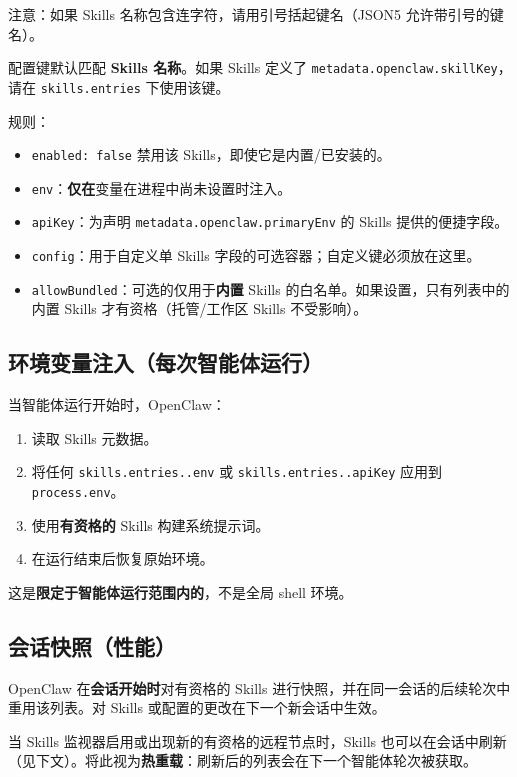 注意：如果 Skills 名称包含连字符，请用引号括起键名（JSON5 允许带引号的键名）。

配置键默认匹配 \textbf{Skills 名称}。如果 Skills 定义了 \texttt{metadata.openclaw.skillKey}，请在 \texttt{skills.entries} 下使用该键。

规则：

\begin{itemize}
  \item \texttt{enabled: false} 禁用该 Skills，即使它是内置/已安装的。
  \item \texttt{env}：\textbf{仅在}变量在进程中尚未设置时注入。
  \item \texttt{apiKey}：为声明 \texttt{metadata.openclaw.primaryEnv} 的 Skills 提供的便捷字段。
  \item \texttt{config}：用于自定义单 Skills 字段的可选容器；自定义键必须放在这里。
  \item \texttt{allowBundled}：可选的仅用于\textbf{内置} Skills 的白名单。如果设置，只有列表中的内置 Skills 才有资格（托管/工作区 Skills 不受影响）。
\end{itemize}


\subsection{环境变量注入（每次智能体运行）}


当智能体运行开始时，OpenClaw：

\begin{enumerate}
  \item 读取 Skills 元数据。
  \item 将任何 \texttt{skills.entries..env} 或 \texttt{skills.entries..apiKey} 应用到 \texttt{process.env}。
  \item 使用\textbf{有资格的} Skills 构建系统提示词。
  \item 在运行结束后恢复原始环境。
\end{enumerate}


这是\textbf{限定于智能体运行范围内的}，不是全局 shell 环境。

\subsection{会话快照（性能）}


OpenClaw 在\textbf{会话开始时}对有资格的 Skills 进行快照，并在同一会话的后续轮次中重用该列表。对 Skills 或配置的更改在下一个新会话中生效。

当 Skills 监视器启用或出现新的有资格的远程节点时，Skills 也可以在会话中刷新（见下文）。将此视为\textbf{热重载}：刷新后的列表会在下一个智能体轮次被获取。

